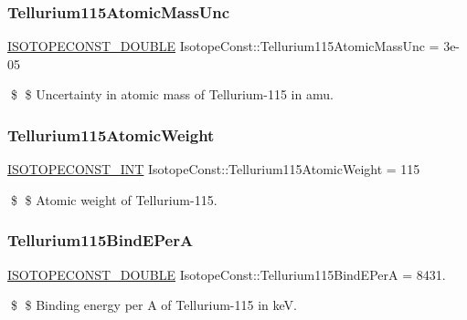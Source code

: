 \subsubsection{\texorpdfstring{Tellurium115\+Atomic\+Mass\+Unc}{Tellurium115AtomicMassUnc}}
{\footnotesize\ttfamily \mbox{\hyperlink{group___isotope_const-_macros_ga8f45a7272ce02c0b4c65c44636ed719a}{I\+S\+O\+T\+O\+P\+E\+C\+O\+N\+S\+T\+\_\+\+D\+O\+U\+B\+LE}} Isotope\+Const\+::\+Tellurium115\+Atomic\+Mass\+Unc = 3e-\/05}

\$ \$ Uncertainty in atomic mass of Tellurium-\/115 in amu. \mbox{\label{group___isotope_const-_tellurium-_te115_ga1e8662c51d01cd03b259410f49d55a4a}} 
\subsubsection{\texorpdfstring{Tellurium115\+Atomic\+Weight}{Tellurium115AtomicWeight}}
{\footnotesize\ttfamily \mbox{\hyperlink{group___isotope_const-_macros_ga5f18360b3e99483a35c32d789e62621c}{I\+S\+O\+T\+O\+P\+E\+C\+O\+N\+S\+T\+\_\+\+I\+NT}} Isotope\+Const\+::\+Tellurium115\+Atomic\+Weight = 115}

\$ \$ Atomic weight of Tellurium-\/115. \mbox{\label{group___isotope_const-_tellurium-_te115_ga2ca23ef102b429b0e97619421fb9b400}} 
\subsubsection{\texorpdfstring{Tellurium115\+Bind\+E\+PerA}{Tellurium115BindEPerA}}
{\footnotesize\ttfamily \mbox{\hyperlink{group___isotope_const-_macros_ga8f45a7272ce02c0b4c65c44636ed719a}{I\+S\+O\+T\+O\+P\+E\+C\+O\+N\+S\+T\+\_\+\+D\+O\+U\+B\+LE}} Isotope\+Const\+::\+Tellurium115\+Bind\+E\+PerA = 8431.}

\$ \$ Binding energy per A of Tellurium-\/115 in keV. \mbox{\label{group___isotope_const-_tellurium-_te115_gad918242a29cd0c8d9ee30cba35833f0c}} 
